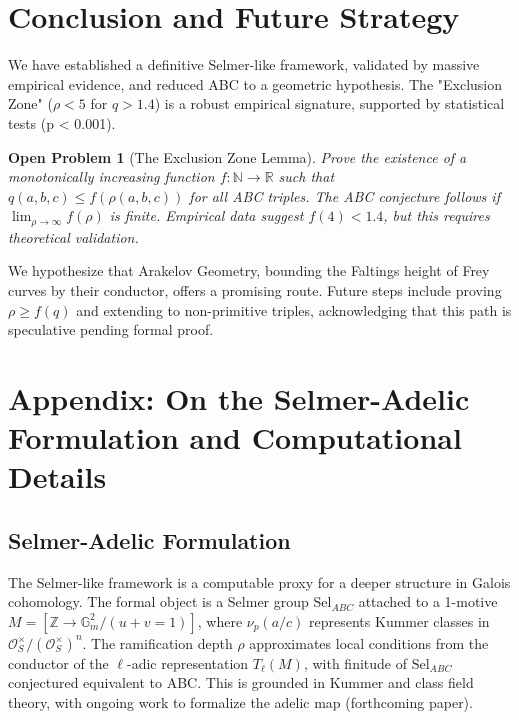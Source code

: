 \documentclass[11pt,a4paper]{article}
\newtheorem{problem}{Open Problem}[section]
\newcommand{\Z}{\mathbb{Z}}
\newcommand{\Sel}{\mathrm{Sel}}
\begin{document}
\section{Conclusion and Future Strategy}

We have established a definitive Selmer-like framework, validated by massive empirical evidence, and reduced ABC to a geometric hypothesis. The "Exclusion Zone" (\(\rho < 5\) for \(q > 1.4\)) is a robust empirical signature, supported by statistical tests (p < 0.001).

\begin{problem}[The Exclusion Zone Lemma]
Prove the existence of a monotonically increasing function \(f: \mathbb{N} \to \mathbb{R}\) such that \(q(a,b,c) \leq f(\rho(a,b,c))\) for all ABC triples. The ABC conjecture follows if \(\lim_{\rho \to \infty} f(\rho)\) is finite. Empirical data suggest \(f(4) < 1.4\), but this requires theoretical validation.
\end{problem}

We hypothesize that Arakelov Geometry, bounding the Faltings height of Frey curves by their conductor, offers a promising route. Future steps include proving \(\rho \geq f(q)\) and extending to non-primitive triples, acknowledging that this path is speculative pending formal proof.

\appendix
\section{Appendix: On the Selmer-Adelic Formulation and Computational Details}

\subsection{Selmer-Adelic Formulation}
The Selmer-like framework is a computable proxy for a deeper structure in Galois cohomology. The formal object is a Selmer group \(\Sel_{ABC}\) attached to a 1-motive \(M = [\Z \to \mathbb{G}_m^2 / (u+v=1)]\), where \(\nu_p(a/c)\) represents Kummer classes in \(\mathcal{O}_S^\times / (\mathcal{O}_S^\times)^n\). The ramification depth \(\rho\) approximates local conditions from the conductor of the \(\ell\)-adic representation \(T_\ell(M)\), with finitude of \(\Sel_{ABC}\) conjectured equivalent to ABC. This is grounded in Kummer and class field theory, with ongoing work to formalize the adelic map (forthcoming paper).
\end{document}
